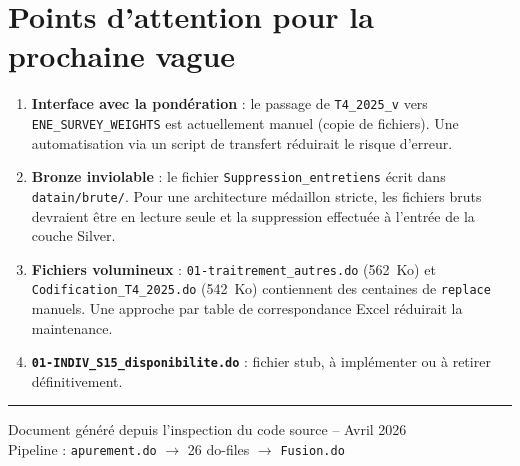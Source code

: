 \documentclass[11pt, a4paper]{article}
\begin{document}
\section{Points d'attention pour la prochaine vague}

\begin{enumerate}[topsep=3pt, itemsep=3pt]
  \item \textbf{Interface avec la pondération} : le passage de
    \texttt{T4\_2025\_v} vers \texttt{ENE\_SURVEY\_WEIGHTS} est
    actuellement manuel (copie de fichiers). Une automatisation
    via un script de transfert réduirait le risque d'erreur.
  \item \textbf{Bronze inviolable} : le fichier \texttt{Suppression\_entretiens}
    écrit dans \texttt{datain/brute/}. Pour une architecture médaillon stricte,
    les fichiers bruts devraient être en lecture seule et la suppression
    effectuée à l'entrée de la couche Silver.
  \item \textbf{Fichiers volumineux} : \texttt{01-traitrement\_autres.do}
    (562~Ko) et \texttt{Codification\_T4\_2025.do} (542~Ko) contiennent
    des centaines de \texttt{replace} manuels. Une approche par table de
    correspondance Excel réduirait la maintenance.
  \item \textbf{\texttt{01-INDIV\_S15\_disponibilite.do}} : fichier stub,
    à implémenter ou à retirer définitivement.
\end{enumerate}

\vspace{1cm}
\hrule
\vspace{0.3cm}
{\small\centering
  Document généré depuis l'inspection du code source -- Avril 2026\\
  Pipeline : \texttt{apurement.do} $\rightarrow$ 26 do-files $\rightarrow$
  \texttt{Fusion.do}
\par}
\end{document}
